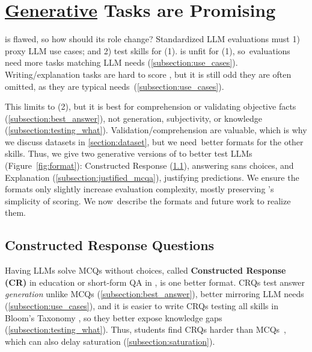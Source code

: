 

\section{\underline{Generative} \mcqa Tasks are Promising} \label{section:fixing_format}

\mcqa is flawed, so how should its role change?
Standardized LLM evaluations must 1) proxy LLM use cases; and 2) test skills for (1).
\mcqa is unfit for (1), so~evaluations need more tasks matching LLM needs (\cref{subsection:use_cases}).
Writing/explanation tasks are hard to score \cite{charney1984validity}, but it is still odd they are often omitted, as they are typical needs~(\cref{subsection:use_cases}).

This limits \mcqa to (2), but it is best for comprehension or validating objective facts (\cref{subsection:best_answer}), not generation, subjectivity, or knowledge (\cref{subsection:testing_what}).
Validation/comprehension are valuable, which is why we discuss \mcqa datasets in \cref{section:dataset}, but we need~better formats for the other skills.
Thus, we give two generative versions of \mcqa to better test LLMs (Figure~\ref{fig:format}):
Constructed Response (\cref{subsection:constructed_response}), answering sans choices, and Explanation \mcqa (\cref{subsection:justified_mcqa}), justifying predictions.
We ensure the formats only slightly increase evaluation complexity, mostly preserving \mcqa's simplicity of scoring. 
We now~describe the formats and future work to realize them.

\subsection{Constructed Response Questions} \label{subsection:constructed_response}

Having LLMs solve MCQs without choices, called \textbf{Constructed Response (CR)} in education \cite{livingston2009constructed} or short-form QA in  \cite{krishna-etal-2021-hurdles}, is one better format.
CRQs test answer \textit{generation} unlike MCQs (\cref{subsection:best_answer}), better mirroring LLM needs (\cref{subsection:use_cases}), and it is easier to write CRQs testing all skills in Bloom's Taxonomy \cite{krathwohl2002revision}, so they better expose knowledge gaps (\cref{subsection:testing_what}).
Thus, students find CRQs harder than MCQs~\cite{hancock1994cognitive}, which can also delay saturation (\cref{subsection:saturation}).

